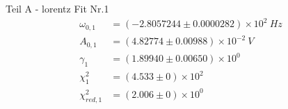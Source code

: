 {\LARGE Teil A - lorentz Fit Nr.1}
\begin{align*}
	\omega_{0,1} &= \left(-2.8057244 \pm 0.0000282\right) \times 10^{2}\ Hz\\
	A_{0,1} &= \left(4.82774 \pm 0.00988\right) \times 10^{-2}\ V\\
	\gamma_1 &= \left(1.89940 \pm 0.00650\right) \times 10^{0}\ \\
	\chi^2_{1} &= \left(4.533 \pm 0\right) \times 10^{2}\ \\
	\chi^2_{red,1} &= \left(2.006 \pm 0\right) \times 10^{0}\ \\
\end{align*}